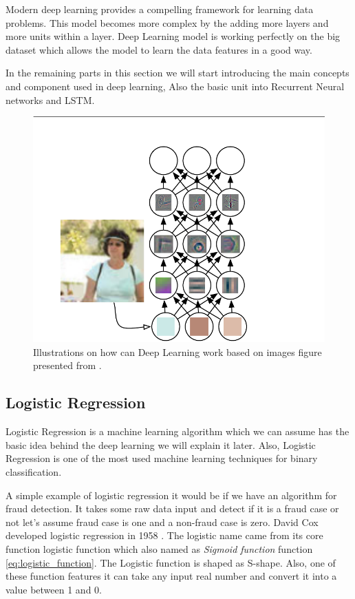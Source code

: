       
Modern deep learning provides a compelling framework for learning data problems. This model becomes more complex by the adding more layers and more units within a layer. Deep Learning model is working perfectly on the big dataset which allows the model to learn the data features in a good way.


In the remaining parts in this section we will start introducing the main concepts and component used in deep learning, Also the basic unit into Recurrent Neural networks and LSTM.

      
\begin{figure}[h!] \includegraphics[width=\linewidth]{./Figures/Ch_2_Background/DeepLearningImagePersonExample.png}
  \caption{Illustrations on how can Deep Learning work based on images figure presented from \cite{Goodfellow-et-al-2016} \cite{Zeiler2014}.}
  \label{fig:DeepLearningImagePersonExample.png}
\end{figure}


\newpage
\subsection{Logistic Regression}
Logistic Regression is a machine learning algorithm which we can assume has the basic idea behind the deep learning we will explain it later. Also, Logistic Regression is one of the most used machine learning techniques for binary classification.

A simple example of logistic regression it would be if we have an algorithm for fraud detection. It takes some raw data input and detect if it is a fraud case or not let’s assume fraud case is one and a non-fraud case is zero. David Cox developed logistic regression in 1958 \cite{Cox2958}. The logistic name came from its core function logistic function which also named as \textit{Sigmoid function}  function \eqref{eq:logistic_function}. The Logistic function is shaped as S-shape. %
Also, one of these function features it can take any input real number and convert it into a value between 1 and 0.


